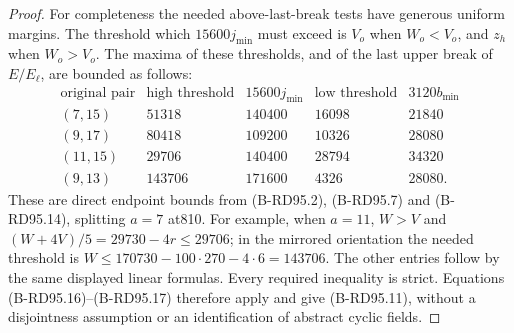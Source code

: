 \begin{proof}
For completeness the needed above-last-break tests have generous
uniform margins. The threshold which $15600j_{\min}$ must exceed
is $V_o$ when $W_o<V_o$, and $z_h$ when $W_o>V_o$.
The maxima of these thresholds, and of the last upper break of
$E/E_\ell$, are bounded as follows:
\[
\begin{array}{c|r|r|r|r}
 \text{original pair}&\text{high threshold}&15600j_{\min}&
     \text{low threshold}&3120b_{\min}\\\hline
 (7,15)&51318&140400&16098&21840\\
 (9,17)&80418&109200&10326&28080\\
 (11,15)&29706&140400&28794&34320\\
 (9,13)&143706&171600&4326&28080.
\end{array}                                           \tag{B-RD95.18}
\]
These are direct endpoint bounds from (B-RD95.2), (B-RD95.7)
and (B-RD95.14), splitting $a=7$ at810. For example, when
$a=11$, $W>V$ and $(W+4V)/5=29730-4r\le29706$;
in the mirrored orientation the needed threshold is
$W\le170730-100\cdot270-4\cdot6=143706$.
The other entries follow by the same displayed linear formulas.
Every required inequality is strict. Equations (B-RD95.16)--(B-RD95.17)
therefore apply and give (B-RD95.11), without a disjointness
assumption or an identification of abstract cyclic fields.
\end{proof}


